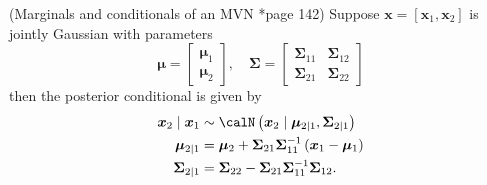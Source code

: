 \begin{thm}\label{theorem: cond_of_MVN}
    (Marginals and conditionals of an MVN \cite{MurphyKevinP2012Ml}*{page 142}) Suppose $\bm{x} = [ \bm{x}_1, \bm{x}_2 ]$ is jointly Gaussian with parameters
    \[
        \bm{\mu} =
        \begin{bmatrix}
            \bm{\mu}_1 \\
            \bm{\mu}_2
        \end{bmatrix}, \quad
        \bm{\Sigma} =
        \begin{bmatrix}
            \bm{\Sigma}_{11} & \bm{\Sigma}_{12} \\
            \bm{\Sigma}_{21} & \bm{\Sigma}_{22}
        \end{bmatrix}
    \]
    then the posterior conditional is given by
    \begin{align*}
        \bm{x}_2 \mid \bm{x}_1 & \sim \calN \left( \bm{x}_2 \mid \bm{\mu}_{2 \mid 1}, \bm{\Sigma}_{2 \mid 1} \right)        \\
        \bm{\mu}_{2 \mid 1}    & = \bm{\mu}_2 + \bm{\Sigma}_{21} \bm{\Sigma}_{11}^{-1} \left( \bm{x}_1 - \bm{\mu}_1 \right) \\
        \bm{\Sigma}_{2 \mid 1} & = \bm{\Sigma}_{22} - \bm{\Sigma}_{21} \bm{\Sigma}_{11}^{-1} \bm{\Sigma}_{12}.
    \end{align*}
\end{thm}

